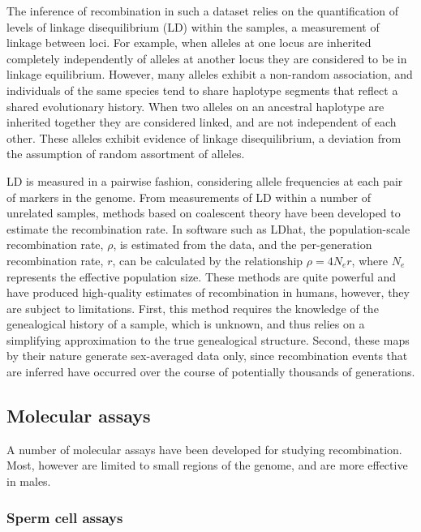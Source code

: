 The inference of recombination in such a dataset relies on the quantification of levels of linkage disequilibrium (LD) within the samples, a measurement of linkage between loci.
For example, when alleles at one locus are inherited completely independently of alleles at another locus they are considered to be in linkage equilibrium.
However, many alleles exhibit a non-random association, and individuals of the same species tend to share haplotype segments that reflect a shared evolutionary history.
When two alleles on an ancestral haplotype are inherited together they are considered linked, and are not independent of each other.
These alleles exhibit evidence of linkage disequilibrium, a deviation from the assumption of random assortment of alleles.

LD is measured in a pairwise fashion, considering allele frequencies at each pair of markers in the genome.
From measurements of LD within a number of unrelated samples, methods based on coalescent theory have been developed to estimate the recombination rate\cite{Auton2012}.
In software such as LDhat\cite{Mcvean2004,Auton2007,Auton2014}, the population-scale recombination rate, $\rho$, is estimated from the data, and the per-generation recombination rate, $r$, can be calculated by the relationship
$\rho = 4 N_e r$,
where $N_e$ represents the effective population size.
These methods are quite powerful and have produced high-quality estimates of recombination in humans\cite{hapmap2007}, however, they are subject to limitations.
First, this method requires the knowledge of the genealogical history of a sample, which is unknown, and thus relies on a simplifying approximation to the true genealogical structure.
Second, these maps by their nature generate sex-averaged data only, since recombination events that are inferred have occurred over the course of potentially thousands of generations.


\subsection{Molecular assays}

A number of molecular assays have been developed for studying recombination.
Most, however are limited to small regions of the genome, and are more effective in males.

\subsubsection{Sperm cell assays}

